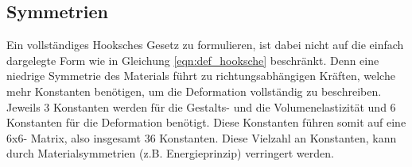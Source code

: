 \subsection{Symmetrien}
Ein vollständiges Hooksches Gesetz zu formulieren, ist dabei nicht auf die einfach dargelegte Form wie 
in Gleichung \ref{eqn:def_hooksche} beschränkt.
Denn eine niedrige Symmetrie des Materials führt zu richtungsabhängigen Kräften, welche mehr Konstanten
benötigen, um die Deformation vollständig zu beschreiben.
Jeweils 3 Konstanten werden für die Gestalts- und die Volumenelastizität und 6 Konstanten für die Deformation benötigt.
Diese Konstanten führen somit auf eine 6x6- Matrix, also insgesamt 36 Konstanten.\newline
Diese Vielzahl an Konstanten, kann durch Materialsymmetrien (z.\;B. Energieprinzip) verringert werden.




